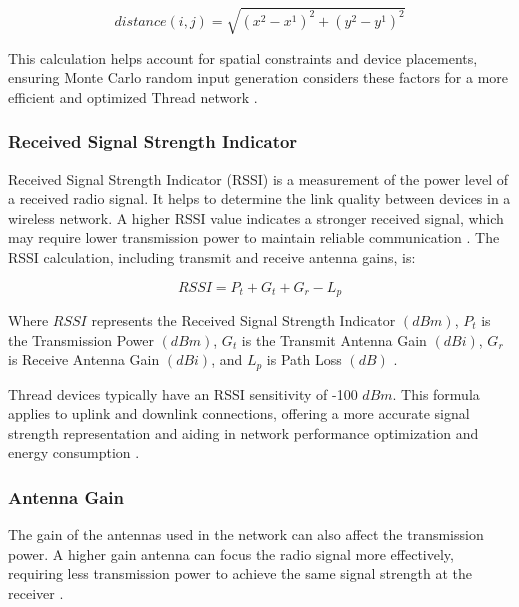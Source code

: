 \begin{equation}\label{eq:euclidean_distance}
    distance\left(i,j\right)=\sqrt{\left(x^2-x^1\right)^2+\left(y^2-y^1\right)^2}
\end{equation}

This calculation helps account for spatial constraints and device placements, ensuring Monte Carlo random input generation considers these factors for a more efficient and optimized Thread network \cite{dokmanic2015euclidean}.

\subsubsection{Received Signal Strength Indicator}

Received Signal Strength Indicator (RSSI) is a measurement of the power level of a received radio signal. It helps to determine the link quality between devices in a wireless network. A higher RSSI value indicates a stronger received signal, which may require lower transmission power to maintain reliable communication \cite{benkic2008rssi}. The RSSI calculation, including transmit and receive antenna gains, is:

\begin{equation}\label{eq:rssi}
    RSSI=P_t+G_t+G_r-L_p
\end{equation}

Where $RSSI$ represents the Received Signal Strength Indicator $\left(dBm\right)$, $P_t$ is the Transmission Power $\left(dBm\right)$, $G_t$ is the Transmit Antenna Gain $\left(dBi\right)$, $G_r$ is Receive Antenna Gain $\left(dBi\right)$, and $L_p$ is Path Loss $\left(dB\right)$ \cite{doi:10.1155/2014/371350}.

Thread devices typically have an RSSI sensitivity of -100 $dBm$. This formula applies to uplink and downlink connections, offering a more accurate signal strength representation and aiding in network performance optimization and energy consumption \cite{semiconductor_nrf52840_2018_1}.

\subsubsection{Antenna Gain}

The gain of the antennas used in the network can also affect the transmission power. A higher gain antenna can focus the radio signal more effectively, requiring less transmission power to achieve the same signal strength at the receiver \cite{wu2014study}.

